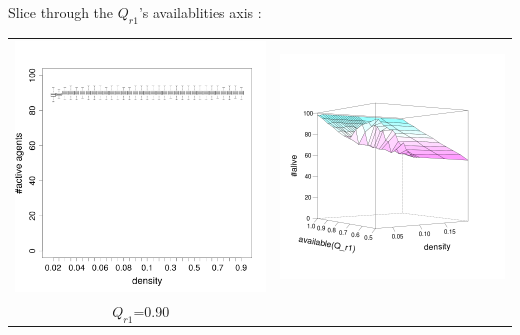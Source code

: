 \documentclass[8pt, handout=show,notes=show]{beamer}
\begin{document}
\begin{frame}{ Slice through the $Q_{r1}$'s availablities axis : }
\begin{table}[H]
\begin{tabular}{cc}
			\includegraphics[width=\imgSize]{images/alive_density_r1-90.png}&
			\includegraphics[width=\imgSize]{images/active_median}\\
			$Q_{r1}$=0.90&\\
		\end{tabular}

	\end{table}

\end{frame}
\end{document}
